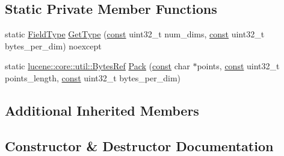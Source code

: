 \subsection*{Static Private Member Functions}
\begin{DoxyCompactItemize}
\item 
static \mbox{\hyperlink{classlucene_1_1core_1_1document_1_1FieldType}{Field\+Type}} \mbox{\hyperlink{classlucene_1_1core_1_1document_1_1BinaryPoint_a257a399b76249bf887b61a524765fa72}{Get\+Type}} (\mbox{\hyperlink{ZlibCrc32_8h_a2c212835823e3c54a8ab6d95c652660e}{const}} uint32\+\_\+t num\+\_\+dims, \mbox{\hyperlink{ZlibCrc32_8h_a2c212835823e3c54a8ab6d95c652660e}{const}} uint32\+\_\+t bytes\+\_\+per\+\_\+dim) noexcept
\item 
static \mbox{\hyperlink{classlucene_1_1core_1_1util_1_1BytesRef}{lucene\+::core\+::util\+::\+Bytes\+Ref}} \mbox{\hyperlink{classlucene_1_1core_1_1document_1_1BinaryPoint_a3dd125364391f40b4cc114c3a099542e}{Pack}} (\mbox{\hyperlink{ZlibCrc32_8h_a2c212835823e3c54a8ab6d95c652660e}{const}} char $\ast$points, \mbox{\hyperlink{ZlibCrc32_8h_a2c212835823e3c54a8ab6d95c652660e}{const}} uint32\+\_\+t points\+\_\+length, \mbox{\hyperlink{ZlibCrc32_8h_a2c212835823e3c54a8ab6d95c652660e}{const}} uint32\+\_\+t bytes\+\_\+per\+\_\+dim)
\end{DoxyCompactItemize}
\subsection*{Additional Inherited Members}


\subsection{Constructor \& Destructor Documentation}
\mbox{\label{classlucene_1_1core_1_1document_1_1BinaryPoint_acd524392b16aaeaa05120e87a79e487f}} 
